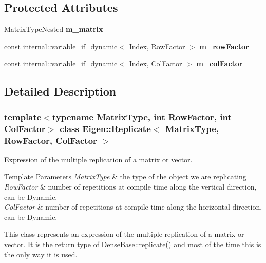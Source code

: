 \subsection*{Protected Attributes}
\begin{DoxyCompactItemize}
\item 
\mbox{\label{class_eigen_1_1_replicate_aea2ec14101efda1e508ce42c98375b3a}} 
Matrix\+Type\+Nested {\bfseries m\+\_\+matrix}
\item 
\mbox{\label{class_eigen_1_1_replicate_aa0a60d49b10d684ab40b99915bf65031}} 
const \mbox{\hyperlink{class_eigen_1_1internal_1_1variable__if__dynamic}{internal\+::variable\+\_\+if\+\_\+dynamic}}$<$ Index, Row\+Factor $>$ {\bfseries m\+\_\+row\+Factor}
\item 
\mbox{\label{class_eigen_1_1_replicate_a669f37c7eddbfaad27e2beae140da7e7}} 
const \mbox{\hyperlink{class_eigen_1_1internal_1_1variable__if__dynamic}{internal\+::variable\+\_\+if\+\_\+dynamic}}$<$ Index, Col\+Factor $>$ {\bfseries m\+\_\+col\+Factor}
\end{DoxyCompactItemize}


\subsection{Detailed Description}
\subsubsection*{template$<$typename Matrix\+Type, int Row\+Factor, int Col\+Factor$>$\newline
class Eigen\+::\+Replicate$<$ Matrix\+Type, Row\+Factor, Col\+Factor $>$}

Expression of the multiple replication of a matrix or vector. 


\begin{DoxyTemplParams}{Template Parameters}
{\em Matrix\+Type} & the type of the object we are replicating \\
\hline
{\em Row\+Factor} & number of repetitions at compile time along the vertical direction, can be Dynamic. \\
\hline
{\em Col\+Factor} & number of repetitions at compile time along the horizontal direction, can be Dynamic.\\
\hline
\end{DoxyTemplParams}
This class represents an expression of the multiple replication of a matrix or vector. It is the return type of Dense\+Base\+::replicate() and most of the time this is the only way it is used.

